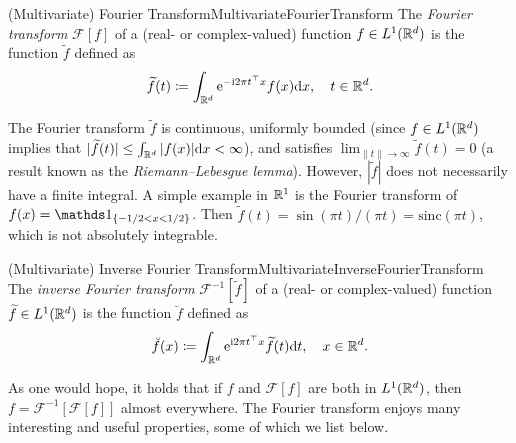 \begin{defn}{(Multivariate) Fourier Transform}{MultivariateFourierTransform}
	The \textit{Fourier transform} \(\mathcal{F}[f]\) of a (real- or complex-valued) function \(f \in L^1(\mathbb{R}^d)\) is the function \(\widetilde{f}\) defined as
	\begin{equation*}
		\widetilde{f}(t) \coloneqq \int_{\mathbb{R}^d} \mathrm{e}^{-\mathrm{i} 2\pi t^\top x} f(x) \mathrm{d} x, \quad t \in \mathbb{R}^d.
	\end{equation*}
\end{defn}

The Fourier transform \(\widetilde{f}\) is continuous, uniformly bounded (since \(f \in L^1(\mathbb{R}^d)\) implies that \(|\widetilde{f}(t)| \le \int_{\mathbb{R}^d} |f(x)| \mathrm{d} x < \infty\)), and satisfies \(\lim_{\|t\| \to \infty} \widetilde{f}(t) = 0\) (a result known as the \textit{Riemann--Lebesgue lemma}). However, \(|\widetilde{f}|\) does not necessarily have a finite integral. A simple example in \(\mathbb{R}^1\) is the Fourier transform of \(f(x) = \I_{\{-1/2 < x < 1/2\}}\). Then \(\widetilde{f}(t) = \sin(\pi t)/(\pi t) = \mathrm{sinc}(\pi t)\), which is not absolutely integrable.

\begin{defn}{(Multivariate) Inverse Fourier Transform}{MultivariateInverseFourierTransform}
	The \textit{inverse Fourier transform} \(\mathcal{F}^{-1}[\widetilde{f}]\) of a (real- or complex-valued) function \(\widetilde{f} \in L^1(\mathbb{R}^d)\) is the function \(\breve{f}\) defined as
	\begin{equation*}
		\breve{f}(x) \coloneqq \int_{\mathbb{R}^d} \mathrm{e}^{\mathrm{i} 2\pi t^\top x} \widetilde{f}(t) \mathrm{d} t, \quad x \in \mathbb{R}^d.
	\end{equation*}
\end{defn}

As one would hope, it holds that if \(f\) and \(\mathcal{F}[f]\) are both in \(L^1(\mathbb{R}^d)\), then \(f = \mathcal{F}^{-1}[\mathcal{F}[f]]\) almost everywhere.
The Fourier transform enjoys many interesting and useful properties, some of which we list below.


